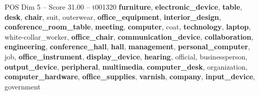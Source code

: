 \begin{textsample}{POS Dim 5 – Score 31.00 – t001320}  \label{ex:f5_pos_018}
\textbf{furniture}, \textbf{electronic\_device}, \textbf{table}, \textbf{desk}, \textbf{chair}, suit, outerwear, \textbf{office\_equipment}, \textbf{interior\_design}, \textbf{conference\_room\_table}, \textbf{meeting}, \textbf{computer}, coat, \textbf{technology}, \textbf{laptop}, white-collar\_worker, \textbf{office\_chair}, \textbf{communication\_device}, \textbf{collaboration}, \textbf{engineering}, \textbf{conference\_hall}, \textbf{hall}, \textbf{management}, \textbf{personal\_computer}, job, \textbf{office\_instrument}, \textbf{display\_device}, \textbf{hearing}, official, businessperson, \textbf{output\_device}, \textbf{peripheral}, \textbf{multimedia}, \textbf{computer\_desk}, organization, \textbf{computer\_hardware}, \textbf{office\_supplies}, \textbf{varnish}, \textbf{company}, \textbf{input\_device}, government

\end{textsample}

